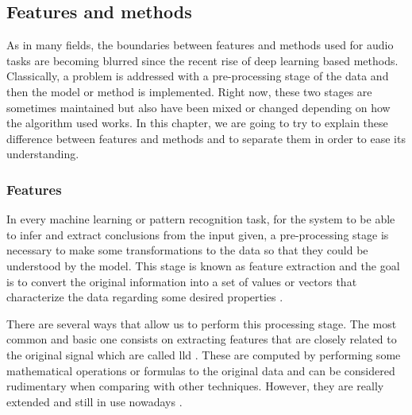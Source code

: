 
\subsection{Features and methods}
	
	As in many fields, the boundaries between features and methods used for audio tasks are becoming blurred since the recent rise of deep learning based methods. Classically, a problem is addressed with a pre-processing stage of the data and then the model or method is implemented. Right now, these two stages are sometimes maintained but also have been mixed or changed depending on how the algorithm used works. In this chapter, we are going to try to explain these difference between features and methods and to separate them in order to ease its understanding.

\subsubsection{Features}

	In every machine learning or pattern recognition task, for the system to be able to infer and extract conclusions from the input given, a pre-processing stage is necessary to make some transformations to the data so that they could be understood by the model. This stage is known as feature extraction and the goal is to convert the original information into a set of values or vectors that characterize the data regarding some desired properties \cite{Giannakopoulos2014}.
	
	There are several ways that allow us to perform this processing stage. The most common and basic one consists on extracting features that are closely related to the original signal which are called \acrfull{lld}  \cite{Amatriain2004}. These are computed by performing some mathematical operations or formulas to the original data and can be considered rudimentary when comparing with other techniques. However, they are really extended and still in use nowadays \cite{Marr1982}. 
	
